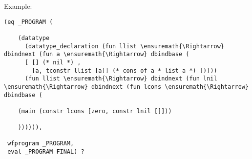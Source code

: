 Example:

\begin{verbatim}
(eq _PROGRAM (

    (datatype
      (datatype_declaration (fun llist \ensuremath{\Rightarrow} dbindnext (fun a \ensuremath{\Rightarrow} dbindbase (
      [ [] (* nil *) ,
        [a, tconstr llist [a]] (* cons of a * list a *) ]))))
      (fun llist \ensuremath{\Rightarrow} dbindnext (fun lnil \ensuremath{\Rightarrow} dbindnext (fun lcons \ensuremath{\Rightarrow} dbindbase (

    (main (constr lcons [zero, constr lnil []]))

    )))))),

 wfprogram _PROGRAM,
 eval _PROGRAM FINAL) ?
\end{verbatim}

